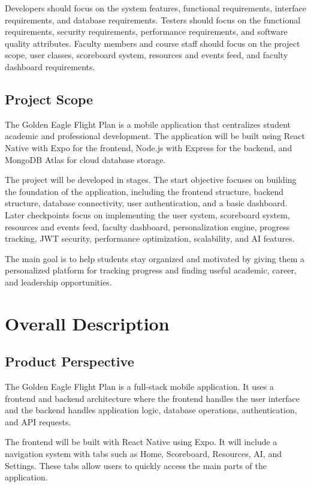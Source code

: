 \documentclass{scrreprt}
\begin{document}
Developers should focus on the system features, functional requirements, interface requirements, and database requirements. Testers should focus on the functional requirements, security requirements, performance requirements, and software quality attributes. Faculty members and course staff should focus on the project scope, user classes, scoreboard system, resources and events feed, and faculty dashboard requirements.

\section{Project Scope}
The Golden Eagle Flight Plan is a mobile application that centralizes student academic and professional development. The application will be built using React Native with Expo for the frontend, Node.js with Express for the backend, and MongoDB Atlas for cloud database storage.

The project will be developed in stages. The start objective focuses on building the foundation of the application, including the frontend structure, backend structure, database connectivity, user authentication, and a basic dashboard. Later checkpoints focus on implementing the user system, scoreboard system, resources and events feed, faculty dashboard, personalization engine, progress tracking, JWT security, performance optimization, scalability, and AI features.

The main goal is to help students stay organized and motivated by giving them a personalized platform for tracking progress and finding useful academic, career, and leadership opportunities.

\chapter{Overall Description}

\section{Product Perspective}
The Golden Eagle Flight Plan is a full-stack mobile application. It uses a frontend and backend architecture where the frontend handles the user interface and the backend handles application logic, database operations, authentication, and API requests.

The frontend will be built with React Native using Expo. It will include a navigation system with tabs such as Home, Scoreboard, Resources, AI, and Settings. These tabs allow users to quickly access the main parts of the application.
\end{document}
